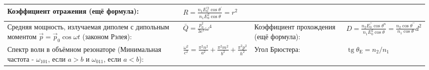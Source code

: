 \documentclass{article}
\begin{document}
\begin{tabular}{ |p{5cm}|p{4.5cm}|p{6cm}|p{3.5cm}|  }
Коэффициент отражения (ещё формула):                                       &
$R=\frac{n_{1} E_{0}^{\prime 2} \cos \theta^{\prime}}{n_{1} E_{0}^{2} \cos \theta}=r^{2}$\\
\hline
Средняя мощность, излучаемая диполем с дипольным моментом $\vec{p}=\vec{p}_{0} \cos \omega t$ (законом Рэлея):&
$\bar{Q}=\frac{p_{0}^{2}}{3 c^{3}} \omega^{4}$                             &
Коэффициент прохождения (ещё формула):                                     &
$D=\frac{n_{2} E_{0}^{\prime \prime} \cos \theta^{n}}{n_{1} E_{0}^{2} \cos \theta}=\frac{n_{2} \cos \theta^{\prime \prime}}{n_{1} \cos \theta} d^{2}$\\
\hline
Спектр волн в объёмном резонаторе (Минимальная частота - $\omega_{101}$, если $a > b$ и $\omega_{011}$, если $a < b$): &
$\frac{\omega^{2}}{c^{2}}=\frac{\pi^{2} n^{2}}{a^{2}}+\frac{\pi^{2} m^{2}}{b^{2}}+\frac{\pi^{2} p^{2}}{h^{2}}$ &
Угол Брюстера:                                                             &
$\operatorname{tg} \theta_{\mathrm{E}}=n_{2} / n_{1}$                      \\
\hline
\end{tabular}

\newpage
\end{document}

